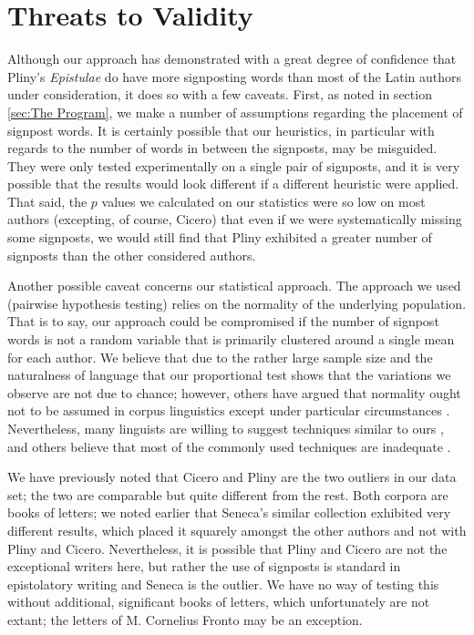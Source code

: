 \section{Threats to Validity}
\label{sec:Threats to Validity}

Although our approach has demonstrated with a great degree of confidence that Pliny's \textit{Epistulae} do have more signposting words than most of the Latin authors under consideration, it does so with a few caveats. First, as noted in section \ref{sec:The Program}, we make a number of assumptions regarding the placement of signpost words. It is certainly possible that our heuristics, in particular with regards to the number of words in between the signposts, may be misguided. They were only tested experimentally on a single pair of signposts, and it is very possible that the results would look different if a different heuristic were applied. That said, the $p$ values we calculated on our statistics were so low on most authors (excepting, of course, Cicero) that even if we were systematically missing some signposts, we would still find that Pliny exhibited a greater number of signposts than the other considered authors.

Another possible caveat concerns our statistical approach. The approach we used (pairwise hypothesis testing) relies on the normality of the underlying population. That is to say, our approach could be compromised if the number of signpost words is not a random variable that is primarily clustered around a single mean for each author. We believe that due to the rather large sample size and the naturalness of language that our proportional test shows that the variations we observe are not due to chance; however, others have argued that normality ought not to be assumed in corpus linguistics except under particular circumstances \cite{chi2}. Nevertheless, many linguists are willing to suggest techniques similar to ours \cite{gries}, and others believe that most of the commonly used techniques are inadequate \cite{bestgen}.

We have previously noted that Cicero and Pliny are the two outliers in our data set; the two are comparable but quite different from the rest. Both corpora are books of letters; we noted earlier that Seneca's similar collection exhibited very different results, which placed it squarely amongst the other authors and not with Pliny and Cicero. Nevertheless, it is possible that Pliny and Cicero are not the exceptional writers here, but rather the use of signposts is standard in epistolatory writing and Seneca is the outlier. We have no way of testing this without additional, significant books of letters, which unfortunately are not extant; the letters of M. Cornelius Fronto may be an exception.


